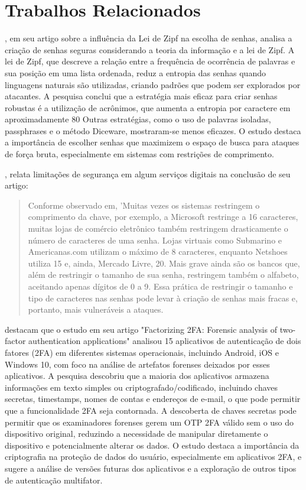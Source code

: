 \documentclass[12pt]{article}
\begin{document}
\section{Trabalhos Relacionados}

\cite{article:1}, em seu artigo sobre a influência da Lei de Zipf na
escolha de senhas, analisa a criação de senhas seguras considerando a
teoria da informação e a lei de Zipf.
A lei de Zipf, que descreve a relação entre a frequência de ocorrência de
palavras e sua posição em uma lista ordenada, reduz a entropia das senhas
quando linguagens naturais são utilizadas, criando padrões que podem ser
explorados por atacantes.
A pesquisa conclui que a estratégia mais eficaz para criar senhas robustas
é a utilização de acrônimos, que aumenta a entropia por caractere em
aproximadamente 80%
Outras estratégias, como o uso de palavras isoladas, passphrases e o
método Diceware, mostraram-se menos eficazes.
O estudo destaca a importância de escolher senhas que maximizem o espaço
de busca para ataques de força bruta, especialmente em sistemas com
restrições de comprimento.

\cite{article:1}, relata limitações de segurança em algum serviços
digitais na conclusão de seu artigo:
\begin{quote}
  Conforme observado em, 'Muitas vezes os sistemas restringem o comprimento da chave, por exemplo, a
  Microsoft restringe a 16 caracteres, muitas lojas de comércio eletrônico também restringem drasticamente o
  número de caracteres de uma senha. Lojas virtuais como Submarino e Americanas.com utilizam o máximo de 8
  caracteres, enquanto Netshoes utiliza 15 e, ainda, Mercado Livre, 20. Mais grave ainda são os bancos que,
  além de restringir o tamanho de sua senha, restringem também o alfabeto, aceitando apenas dígitos de 0 a 9.
  Essa prática de restringir o tamanho e tipo de caracteres nas senhas pode levar à criação de senhas mais
  fracas e, portanto, mais vulneráveis a ataques. \cite{article:1}
\end{quote}

\cite{article:2} destacam que o estudo em seu artigo "Factorizing 2FA:
Forensic analysis of two-factor authentication applications" analisou 15
aplicativos de autenticação de dois fatores (2FA) em diferentes sistemas
operacionais, incluindo Android, iOS e Windows 10, com foco na análise de
artefatos forenses deixados por esses aplicativos.
A pesquisa descobriu que a maioria dos aplicativos armazena informações em
texto simples ou criptografado/codificado, incluindo chaves secretas,
timestamps, nomes de contas e endereços de e-mail, o que pode permitir que
a funcionalidade 2FA seja contornada.
A descoberta de chaves secretas pode permitir que os examinadores forenses
gerem um OTP 2FA válido sem o uso do dispositivo original, reduzindo a
necessidade de manipular diretamente o dispositivo e potencialmente alterar
os dados.
O estudo destaca a importância da criptografia na proteção de dados do
usuário, especialmente em aplicativos 2FA, e sugere a análise de versões
futuras dos aplicativos e a exploração de outros tipos de autenticação
multifator.
\end{document}
